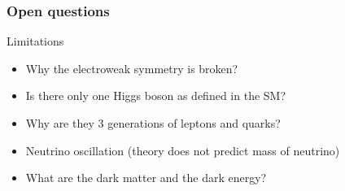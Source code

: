 \documentclass{beamer}
\begin{document}
    \begin{frame}
      \frametitle{Open questions}


      \begin{alertblock}{Limitations}
        \begin{itemize}
          \item Why the electroweak symmetry is broken?
          \item Is there only one Higgs boson as defined in the SM?
          \item Why are they 3 generations of leptons and quarks?
          \item Neutrino oscillation (theory does not predict mass of neutrino)
          \item What are the dark matter and the dark energy?
        \end{itemize}
      \end{alertblock}
      
    \end{frame}
    
\end{document}

